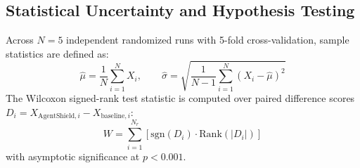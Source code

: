\documentclass[runningheads]{llncs}
\begin{document}
\subsection{Statistical Uncertainty and Hypothesis Testing}
Across $N = 5$ independent randomized runs with 5-fold cross-validation, sample statistics are defined as:
\begin{equation}
\hat{\mu} = \frac{1}{N} \sum_{i=1}^N X_i, \qquad \hat{\sigma} = \sqrt{\frac{1}{N-1} \sum_{i=1}^N (X_i - \hat{\mu})^2}
\end{equation}
The Wilcoxon signed-rank test statistic is computed over paired difference scores $D_i = X_{\mathrm{AgentShield}, i} - X_{\mathrm{baseline}, i}$:
\begin{equation}
W = \sum_{i=1}^{N_r} \left[ \mathrm{sgn}(D_i) \cdot \mathrm{Rank}(|D_i|) \right]
\end{equation}
with asymptotic significance at $p < 0.001$.
\end{document}
